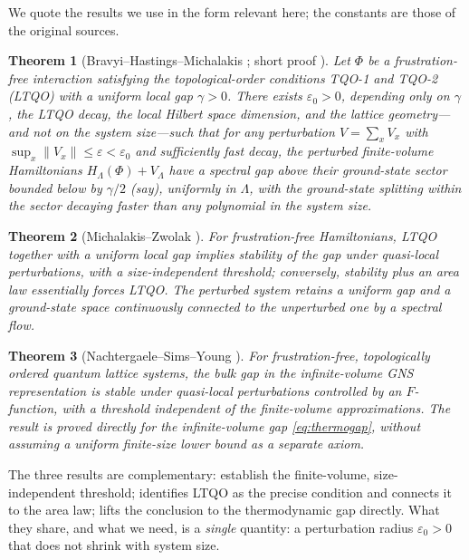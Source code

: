 \documentclass[12pt]{article}
\newcommand{\Ffun}{F}                          %
\newcommand{\norm}[1]{\lVert #1 \rVert}
\theoremstyle{plain}
\newtheorem{theorem}{Theorem}[section]
\theoremstyle{definition}
\theoremstyle{remark}
\begin{document}
We quote the results we use in the form relevant here; the constants are those of the
original sources.

\begin{theorem}[Bravyi--Hastings--Michalakis \cite{bhm-stability}; short proof
\cite{bravyi-hastings-shortproof}]
\label{thm:bhm}
Let $\Phi$ be a frustration-free interaction satisfying the topological-order
conditions TQO-1 and TQO-2 (LTQO) with a uniform local gap $\gamma>0$. There exists
$\varepsilon_0>0$, depending only on $\gamma$, the LTQO decay, the local Hilbert space
dimension, and the lattice geometry---and \emph{not} on the system size---such that
for any perturbation $V=\sum_x V_x$ with $\sup_x\norm{V_x}\le\varepsilon<\varepsilon_0$
and sufficiently fast decay, the perturbed finite-volume Hamiltonians
$H_\Lambda(\Phi)+V_\Lambda$ have a spectral gap above their ground-state sector
bounded below by $\gamma/2$ (say), uniformly in $\Lambda$, with the ground-state
splitting within the sector decaying faster than any polynomial in the system size.
\end{theorem}

\begin{theorem}[Michalakis--Zwolak \cite{michalakis-zwolak}]
\label{thm:mz}
For frustration-free Hamiltonians, LTQO together with a uniform local gap implies
stability of the gap under quasi-local perturbations, with a size-independent
threshold; conversely, stability plus an area law essentially forces LTQO\@. The
perturbed system retains a uniform gap and a ground-state space continuously connected
to the unperturbed one by a spectral flow.
\end{theorem}

\begin{theorem}[Nachtergaele--Sims--Young \cite{nsy-bulkgap}]
\label{thm:nsy}
For frustration-free, topologically ordered quantum lattice systems, the bulk gap in
the infinite-volume GNS representation is stable under quasi-local perturbations
controlled by an $\Ffun$-function, with a threshold independent of the finite-volume
approximations. The result is proved directly for the infinite-volume gap
\eqref{eq:thermogap}, without assuming a uniform finite-size lower bound as a separate
axiom.
\end{theorem}

The three results are complementary: \cite{bhm-stability,bravyi-hastings-shortproof}
establish the finite-volume, size-independent threshold; \cite{michalakis-zwolak}
identifies LTQO as the precise condition and connects it to the area law;
\cite{nsy-bulkgap} lifts the conclusion to the thermodynamic gap directly. What they
share, and what we need, is a \emph{single} quantity: a perturbation radius
$\varepsilon_0>0$ that does not shrink with system size.
\end{document}

